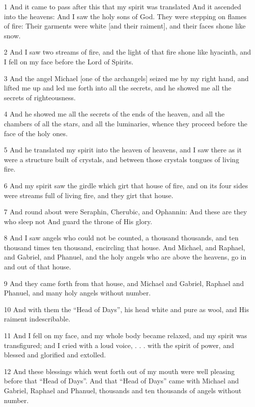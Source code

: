 \par 1 And it came to pass after this that my spirit was translated And it ascended into the heavens: And I saw the holy sons of God. They were stepping on flames of fire: Their garments were white [and their raiment], and their faces shone like snow.
\par 2 And I saw two streams of fire, and the light of that fire shone like hyacinth, and I fell on my face before the Lord of Spirits.
\par 3 And the angel Michael [one of the archangels] seized me by my right hand, and lifted me up and led me forth into all the secrets, and he showed me all the secrets of righteousness.
\par 4 And he showed me all the secrets of the ends of the heaven, and all the chambers of all the stars, and all the luminaries, whence they proceed before the face of the holy ones.
\par 5 And he translated my spirit into the heaven of heavens, and I saw there as it were a structure built of crystals, and between those crystals tongues of living fire.
\par 6 And my spirit saw the girdle which girt that house of fire, and on its four sides were streams full of living fire, and they girt that house.
\par 7 And round about were Seraphin, Cherubic, and Ophannin: And these are they who sleep not And guard the throne of His glory.
\par 8 And I saw angels who could not be counted, a thousand thousands, and ten thousand times ten thousand, encircling that house. And Michael, and Raphael, and Gabriel, and Phanuel, and the holy angels who are above the heavens, go in and out of that house.
\par 9 And they came forth from that house, and Michael and Gabriel, Raphael and Phanuel, and many holy angels without number.
\par 10 And with them the “Head of Days”, his head white and pure as wool, and His raiment indescribable.
\par 11 And I fell on my face, and my whole body became relaxed, and my spirit was transfigured; and I cried with a loud voice, . . . with the spirit of power, and blessed and glorified and extolled.
\par 12 And these blessings which went forth out of my mouth were well pleasing before that “Head of Days”. And that “Head of Days” came with Michael and Gabriel, Raphael and Phanuel, thousands and ten thousands of angels without number. 
